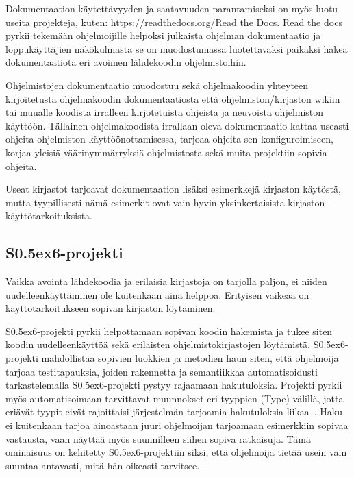 \documentclass[finnish]{tktltiki2}
\theoremstyle{definition}
\theoremstyle{remark}
\begin{document}
Dokumentaation käytettävyyden ja saatavuuden parantamiseksi on myös luotu useita projekteja, kuten: \url{https://readthedocs.org/}{Read the Docs}. Read the docs pyrkii tekemään ohjelmoijille helpoksi julkaista ohjelman dokumentaatio ja loppukäyttäjien näkökulmasta se on muodostumassa luotettavaksi paikaksi hakea dokumentaatiota eri avoimen lähdekoodin ohjelmistoihin.

Ohjelmistojen dokumentaatio muodostuu sekä ohjelmakoodin yhteyteen kirjoitetusta ohjelmakoodin dokumentaatiosta että ohjelmiston/kirjaston wikiin~\cite{using-wikis-in-sw} tai muualle koodista irralleen kirjotetuista ohjeista ja neuvoista ohjelmiston käyttöön.
Tällainen ohjelmakoodista irrallaan oleva dokumentaatio kattaa useasti ohjeita ohjelmiston käyttöönottamisessa, tarjoaa ohjeita sen konfiguroimiseen, korjaa yleisiä väärinymmärryksiä ohjelmistosta sekä muita projektiin sopivia ohjeita.

Useat kirjastot tarjoavat dokumentaation lisäksi esimerkkejä kirjaston käytöstä, mutta tyypillisesti nämä esimerkit ovat vain hyvin yksinkertaisista kirjaston käyttötarkoituksista.

\subsection{S\raise0.5ex\hbox{6}-projekti}
Vaikka avointa lähdekoodia ja erilaisia kirjastoja on tarjolla paljon, ei niiden uudelleenkäyttäminen ole kuitenkaan aina helppoa. Erityisen vaikeaa on käyttötarkoitukseen sopivan kirjaston löytäminen.

S\raise0.5ex\hbox{6}-projekti pyrkii helpottamaan sopivan koodin hakemista ja tukee siten koodin uudelleenkäyttöä sekä erilaisten ohjelmistokirjastojen löytämistä. S\raise0.5ex\hbox{6}-projekti mahdollistaa sopivien luokkien ja metodien haun siten, että ohjelmoija tarjoaa testitapauksia, joiden rakennetta ja semantiikkaa automatisoidusti tarkastelemalla S\raise0.5ex\hbox{6}-projekti pystyy rajaamaan hakutuloksia. Projekti pyrkii myös automatisoimaan tarvittavat muunnokset eri tyyppien (Type) välillä, jotta eriävät tyypit eivät rajoittaisi järjestelmän tarjoamia hakutuloksia liikaa~\cite{what-to-search-for}. Haku ei kuitenkaan tarjoa ainoastaan juuri ohjelmoijan tarjoamaan esimerkkiin sopivaa vastausta, vaan näyttää myös suunnilleen siihen sopiva ratkaisuja. Tämä ominaisuus on kehitetty S\raise0.5ex\hbox{6}-projektiin siksi, että ohjelmoija tietää usein vain suuntaa-antavasti, mitä hän oikeasti tarvitsee.
\end{document}
